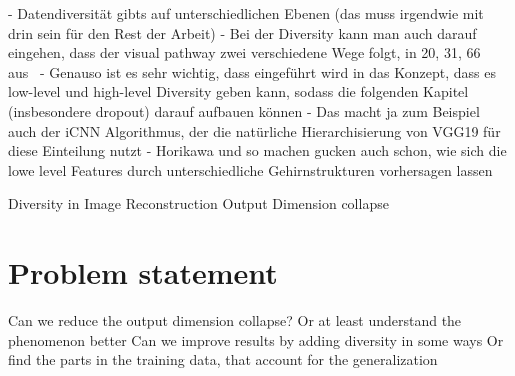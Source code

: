 - Datendiversität gibts auf unterschiedlichen Ebenen (das muss irgendwie mit drin sein für den Rest der Arbeit)
- Bei der Diversity kann man auch darauf eingehen, dass der visual pathway zwei verschiedene Wege folgt, in 20, 31, 66 aus~\cite{chenExploringNaturalnessAIGenerated2023}
    - Genauso ist es sehr wichtig, dass eingeführt wird in das Konzept, dass es low-level und high-level Diversity geben kann, sodass die folgenden Kapitel (insbesondere dropout) darauf aufbauen können
    - Das macht ja zum Beispiel auch der iCNN Algorithmus, der die natürliche Hierarchisierung von VGG19 für diese Einteilung nutzt
    - Horikawa und so machen gucken auch schon, wie sich die lowe level Features durch unterschiedliche Gehirnstrukturen vorhersagen lassen

Diversity in Image Reconstruction 
    Output Dimension collapse~\cite{shirakawaSpuriousReconstructionBrain2024}


\section{Problem statement}
Can we reduce the output dimension collapse?
    Or at least understand the phenomenon better
Can we improve results by adding diversity in some ways
    Or find the parts in the training data, that account for the generalization